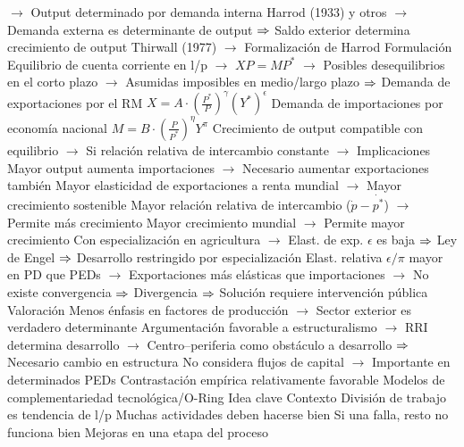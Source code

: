 \documentclass{nuevotema}
\begin{document}
\begin{esquemal}
				\4[] $\to$ Output determinado por demanda interna
				\4[] Harrod (1933) y otros
				\4[] $\to$ Demanda externa es determinante de output
				\4[] $\Rightarrow$ Saldo exterior determina crecimiento de output
				\4[] Thirwall (1977)
				\4[] $\to$ Formalización de Harrod
				\4 Formulación
				\4[] Equilibrio de cuenta corriente en l/p
				\4[] $\to$ $XP = MP^*$
				\4[] $\to$ Posibles desequilibrios en el corto plazo
				\4[] $\to$ Asumidas imposibles en medio/largo plazo
				\4[] $\Rightarrow$
				\4[] Demanda de exportaciones por el RM
				\4[] $X=A \cdot \left( \frac{P^*}{P} \right)^\gamma (Y^*)^\epsilon$
				\4[] Demanda de importaciones por economía nacional
				\4[] $M=B \cdot \left( \frac{P}{P^*} \right)^\eta Y^\pi$
				\4[] Crecimiento de output compatible con equilibrio
				\4[] $\to$ 
				\4[] Si relación relativa de intercambio constante
				\4[] $\to$ 
				\4 Implicaciones
				\4[] Mayor output aumenta importaciones
				\4[] $\to$ Necesario aumentar exportaciones también
				\4[] Mayor elasticidad de exportaciones a renta mundial
				\4[] $\to$ Mayor crecimiento sostenible
				\4[] Mayor relación relativa de intercambio ($\dot{p} - \dot{p^*}$)
				\4[] $\to$ Permite más crecimiento
				\4[] Mayor crecimiento mundial
				\4[] $\to$ Permite mayor crecimiento
				\4[] Con especialización en agricultura
				\4[] $\to$ Elast. de exp. $\epsilon$ es baja
				\4[] $\Rightarrow$ Ley de Engel
				\4[] $\Rightarrow$ Desarrollo restringido por especialización
				\4[] Elast. relativa $\epsilon/\pi$ mayor en PD que PEDs
				\4[] $\to$ Exportaciones más elásticas que importaciones
				\4[] $\to$ No existe convergencia
				\4[] $\Rightarrow$ Divergencia
				\4[] $\Rightarrow$ Solución requiere intervención pública
				\4 Valoración
				\4[] Menos énfasis en factores de producción
				\4[] $\to$ Sector exterior es verdadero determinante
				\4[] Argumentación favorable a estructuralismo
				\4[] $\to$ RRI determina desarrollo
				\4[] $\to$ Centro--periferia como obstáculo a desarrollo
				\4[] $\Rightarrow$ Necesario cambio en estructura
				\4[] No considera flujos de capital
				\4[] $\to$ Importante en determinados PEDs
				\4[] Contrastación empírica relativamente favorable
		\2 Modelos de complementariedad tecnológica/O-Ring
			\3 Idea clave
				\4 Contexto
				\4[] División de trabajo es tendencia de l/p
				\4[] Muchas actividades deben hacerse bien
				\4[] Si una falla, resto no funciona bien
				\4[] Mejoras en una etapa del proceso

\end{esquemal}
\end{document}
